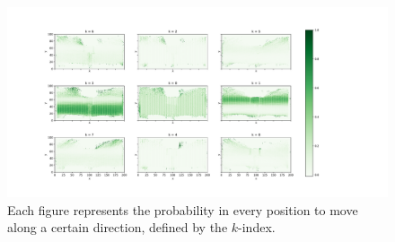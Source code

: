 \documentclass[class=article, crop=false]{standalone}
\begin{document}
\begin{figure}[h!]
\centering
\includegraphics[scale=0.35]{fig/figure_trainf10_all_trajectories_Dx200_Dy100_TensorA_D2Q9}
\captionsetup{width=.6\linewidth}
\caption{Each figure represents the probability in every position to move along a certain direction, defined by the $k$-index.}
\label{fig:TensorA_D2Q9}
\end{figure}


\FloatBarrier
\end{document}
